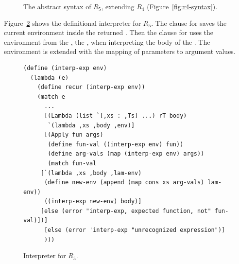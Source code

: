 \documentclass[11pt]{book}
\newcommand{\gray}[1]{{\color{gray} #1}}
\begin{document}
\begin{figure}[tp]
\centering
\fbox{
  \begin{minipage}{0.96\textwidth}
    \small
\[
\begin{array}{lcl}
\Exp &::=& \gray{ \INT{\Int} \mid \READ{} \mid \NEG{\Exp} } \\
     &\mid& \gray{ \ADD{\Exp}{\Exp} 
      \mid \BINOP{\code{'-}}{\Exp}{\Exp} } \\
     &\mid& \gray{ \VAR{\Var} \mid \LET{\Var}{\Exp}{\Exp} } \\
     &\mid& \gray{ \BOOL{\itm{bool}} 
      \mid \AND{\Exp}{\Exp} }\\
     &\mid& \gray{ \OR{\Exp}{\Exp}
      \mid \NOT{\Exp} } \\
     &\mid& \gray{ \BINOP{\itm{cmp}}{\Exp}{\Exp}
      \mid \IF{\Exp}{\Exp}{\Exp} } \\
     &\mid& \gray{ \VECTOR{\Exp} } \\
     &\mid& \gray{ \VECREF{\Exp}{\INT{\Int}} }\\
     &\mid& \gray{ \VECSET{\Exp}{\INT{\Int}}{\Exp}} \\
     &\mid& \gray{ \VOID{} \mid \LP\key{HasType}~\Exp~\Type \RP 
     \mid \APPLY{\Exp}{\Exp\ldots} }\\
     &\mid& \LAMBDA{[\Var\code{:}\Type]\ldots}{\Type}{\Exp}\\
 \Def &::=& \gray{ \FUNDEF{\Var}{([\Var \code{:} \Type]\ldots)}{\Type}{\code{'()}}{\Exp} }\\
  R_5 &::=& \gray{ \PROGRAMDEFSEXP{\code{'()}}{(\Def\ldots)}{\Exp} }
\end{array}
\]
\end{minipage}
}
\caption{The abstract syntax of $R_5$, extending $R_4$ (Figure~\ref{fig:r4-syntax}).}
\label{fig:r5-syntax}
\end{figure}

\label{sec:interp-R5}

Figure~\ref{fig:interp-R5} shows the definitional interpreter for
$R_5$. The clause for  saves the current environment
inside the returned . Then the clause for  uses
the environment from the , the , when
interpreting the body of the .  The 
environment is extended with the mapping of parameters to argument
values.

\begin{figure}[tbp]
\begin{lstlisting}
(define (interp-exp env)
  (lambda (e)
    (define recur (interp-exp env))
    (match e
      ...
      [(Lambda (list `[,xs : ,Ts] ...) rT body)
       `(lambda ,xs ,body ,env)]
      [(Apply fun args)
       (define fun-val ((interp-exp env) fun))
       (define arg-vals (map (interp-exp env) args))
       (match fun-val
	 [`(lambda ,xs ,body ,lam-env)
	  (define new-env (append (map cons xs arg-vals) lam-env))
	  ((interp-exp new-env) body)]
	 [else (error "interp-exp, expected function, not" fun-val)])]
      [else (error 'interp-exp "unrecognized expression")]
      )))
\end{lstlisting}
\caption{Interpreter for $R_5$.}
\label{fig:interp-R5}
\end{figure}
\end{document}
